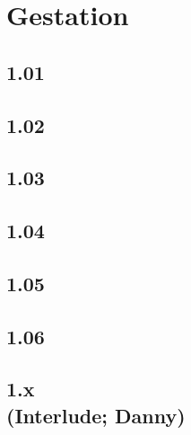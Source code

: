 \part{Gestation}
\chapter{1.01}


\chapter{1.02}


\chapter{1.03}


\chapter{1.04}


\chapter{1.05}


\chapter{1.06}


\chapter[1.x (Interlude; Danny)]{1.x\\(Interlude; Danny)}

